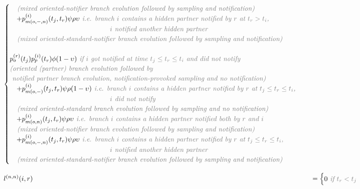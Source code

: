 \documentclass[a4paper,10pt]{article}
\begin{document}
\begin{equation}
\begin{array}{ll}
\begin{cases}
 \textit{\color{gray} ~~~(mixed oriented-notifier branch evolution followed by sampling and notification)}
\\
~~~+p_{m(o,-,n)}^{(i)}(t_j,t_r)\psi\rho\upsilon  \textit{\color{gray} ~i.e. branch $i$ contains a hidden partner notified by $r$ at $t_r > t_i$, }\\
\textit{\color{gray} ~~~~~~~~~~~~~~~~~~~~~~~~~~~~~~~~~~~~~~~~~$i$ notified another hidden partner}\\
 \textit{\color{gray} ~~~(mixed oriented-standard-notifier branch evolution followed by sampling and notification)}
\\
\\
p_o^{(r)}(t_j) p_p^{(i)}(t_r) \phi (1-\upsilon) \textit{\color{gray} ~if $i$ got notified at time $t_j \leq t_r \leq t_i$ and did not notify}\\
\textit{\color{gray} (oriented (partner) branch evolution followed by} \\
\textit{\color{gray}~notified partner branch evolution, notification-provoked sampling and no notification)}
\\
~~~+p_{m(o,-)}^{(i)}(t_j,t_r)\psi\rho(1-\upsilon) \textit{\color{gray} ~i.e. branch $i$ contains a hidden partner notified by $r$ at $t_j \leq t_r \leq t_i$, }\\
\textit{\color{gray} ~~~~~~~~~~~~~~~~~~~~~~~~~~~~~~~~~~~~~~~~~$i$  did not notify}\\
 \textit{\color{gray} ~~~(mixed oriented-standard branch evolution followed by sampling and no notification)}\\
 ~~~+p_{m(o,n)}^{(i)}(t_j,t_r)\psi\rho\upsilon \textit{\color{gray} ~i.e. branch $i$ contains a hidden partner notified both by $r$ and $i$}\\
 \textit{\color{gray} ~~~(mixed oriented-notifier branch evolution followed by sampling and notification)}
\\
~~~+p_{m(o,-,n)}^{(i)}(t_j,t_r)\psi\rho\upsilon  \textit{\color{gray} ~i.e. branch $i$ contains a hidden partner notified by $r$ at $t_j \leq t_r \leq t_i$, }\\
\textit{\color{gray} ~~~~~~~~~~~~~~~~~~~~~~~~~~~~~~~~~~~~~~~~~$i$ notified another hidden partner}\\
 \textit{\color{gray} ~~~(mixed oriented-standard-notifier branch evolution followed by sampling and notification)}
\end{cases}\\
\\
l^{(n,n)}(i,r) &= \begin{cases}0 \textit{\color{gray} ~if $t_r < t_j$}\\

\end{cases}
\end{array}
\end{equation}
\end{document}
